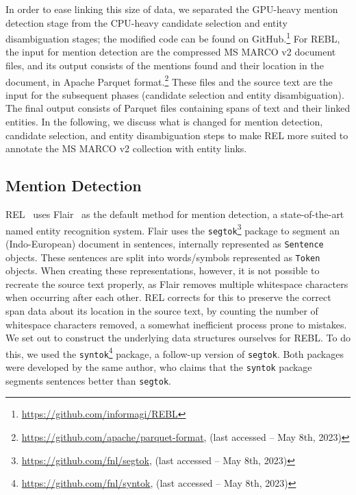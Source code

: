 In order to ease linking this size of data, we separated the GPU-heavy mention detection stage from the CPU-heavy candidate selection and entity disambiguation stages; the modified code can be found on GitHub.\footnote{\url{https://github.com/informagi/REBL}}
For REBL, the input for mention detection are the compressed MS MARCO v2 document files, and its output consists of the mentions found and their location in the document, in Apache Parquet format.\footnote{\url{https://github.com/apache/parquet-format}, (last accessed -- May 8th, 2023)}
These files and the source text are the input for the subsequent phases (candidate selection and entity disambiguation). The final output consists of Parquet files containing spans of text and their linked entities. 
In the following, we discuss what is changed for mention detection, candidate selection, and entity disambiguation steps to make REL more suited to annotate the MS MARCO v2 collection with entity links.  

\subsection{Mention Detection}
REL~\citep{rel} uses Flair~\citep{flair} as the default method for mention detection, a state-of-the-art named entity recognition system. Flair uses the \texttt{segtok}\footnote{\url{https://github.com/fnl/segtok}, (last accessed -- May 8th, 2023)} package to segment an (Indo-European) document in sentences, internally represented as \texttt{Sentence} objects. These sentences are split into words/symbols represented as \texttt{Token} objects. When creating these representations, however, it is not possible to recreate the source text properly, as Flair removes multiple whitespace characters when occurring after each other. REL corrects for this to preserve the correct span data about its location in the source text, by counting the number of whitespace characters removed, a somewhat inefficient process prone to mistakes.
We set out to construct the underlying data structures ourselves for REBL. To do this, we used the \texttt{syntok}\footnote{\url{https://github.com/fnl/syntok}, (last accessed -- May 8th, 2023)} package, a follow-up version of \texttt{segtok}.
Both packages were developed by the same author, who claims that the \texttt{syntok} package segments sentences better than \texttt{segtok}. 

